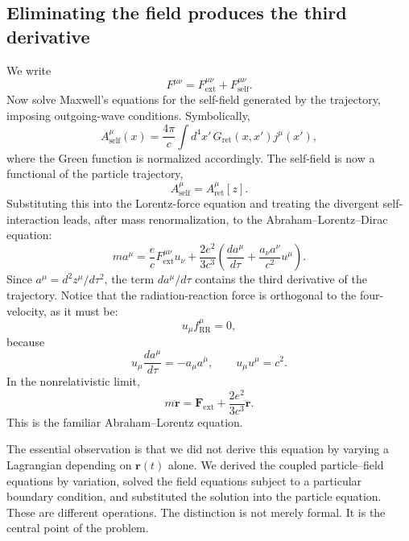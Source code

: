\subsection{ Eliminating the field produces the third derivative}
We write
\[
F^{\mu\nu}
=F_{\mathrm{ext}}^{\mu\nu}
+F_{\mathrm{self}}^{\mu\nu}.
\]
Now solve Maxwell's equations for the self-field generated by the trajectory,
imposing outgoing-wave conditions.
Symbolically,
\[
A^\mu_{\mathrm{self}}(x)
=
\frac{4\pi}{c}
\int d^4x'\,
G_{\mathrm{ret}}(x,x')j^\mu(x'),
\]
where the Green function is normalized accordingly.
The self-field is now a functional of the particle trajectory,
\[
A^\mu_{\mathrm{self}}=A^\mu_{\mathrm{ret}}[z].
\]
Substituting this into the Lorentz-force equation and treating the divergent
self-interaction leads, after mass renormalization, to the
Abraham–Lorentz–Dirac equation:
\[
\boxed{
ma^\mu
=
\frac{e}{c}F_{\mathrm{ext}}^{\mu\nu}u_\nu
+
\frac{2e^2}{3c^3}
\left(
\frac{da^\mu}{d\tau}
+
\frac{a_\nu a^\nu}{c^2}u^\mu
\right).
}
\]
Since \(a^\mu=d^2z^\mu/d\tau^2\), the term \(da^\mu/d\tau\) contains the third
derivative of the trajectory.
Notice that the radiation-reaction force is orthogonal to the four-velocity, as it must be:
\[
u_\mu f_{\mathrm{RR}}^\mu=0,
\]
because
\[
u_\mu\frac{da^\mu}{d\tau}=-a_\mu a^\mu,
\qquad u_\mu u^\mu=c^2.
\]
In the nonrelativistic limit,
\[
\boxed{
m\ddot{\mathbf r}
=
\mathbf F_{\mathrm{ext}}
+
\frac{2e^2}{3c^3}\dddot{\mathbf r}.
}
\]
This is the familiar Abraham–Lorentz equation.

The essential observation is that we did not derive this equation by varying a
Lagrangian depending on \(\mathbf r(t)\) alone.
We derived the coupled particle–field equations by variation, solved the field
equations subject to a particular boundary condition, and substituted the
solution into the particle equation.
These are different operations.
The distinction is not merely formal. It is the central point of the problem.

